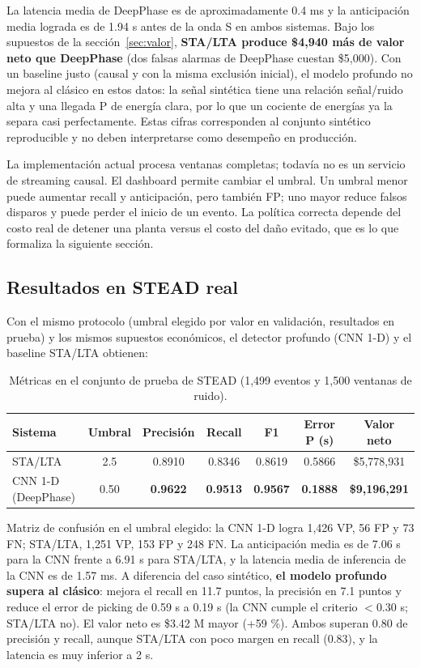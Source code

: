 \documentclass[11pt,letterpaper]{article}
\begin{document}
La latencia media de DeepPhase es de aproximadamente 0.4 ms y la anticipación
media lograda es de 1.94 s antes de la onda S en ambos sistemas. Bajo los
supuestos de la sección~\ref{sec:valor}, \textbf{STA/LTA produce \$4,940 más de
valor neto que DeepPhase} (dos falsas alarmas de DeepPhase cuestan \$5,000). Con
un baseline justo (causal y con la misma exclusión inicial), el modelo profundo
no mejora al clásico en estos datos: la señal sintética tiene una relación
señal/ruido alta y una llegada P de energía clara, por lo que un cociente de
energías ya la separa casi perfectamente. Estas cifras corresponden al conjunto
sintético reproducible y no deben interpretarse como desempeño en producción.

La implementación actual procesa ventanas completas; todavía no es un servicio
de streaming causal. El dashboard permite cambiar el umbral. Un umbral menor puede aumentar recall y
anticipación, pero también FP; uno mayor reduce falsos disparos y puede perder el
inicio de un evento. La política correcta depende del costo real de detener una
planta versus el costo del daño evitado, que es lo que formaliza la siguiente
sección.

\subsection{Resultados en STEAD real}\label{sec:stead-res}
Con el mismo protocolo (umbral elegido por valor en validación, resultados en
prueba) y los mismos supuestos económicos, el detector profundo (CNN 1-D) y el
baseline STA/LTA obtienen:

\begin{table}[h]
\centering
\caption{Métricas en el conjunto de prueba de STEAD (1,499 eventos y 1,500 ventanas de ruido).}
\begin{tabular}{lcccccc}
\toprule
Sistema & Umbral & Precisión & Recall & F1 & Error P (s) & Valor neto\\
\midrule
STA/LTA & 2.5 & 0.8910 & 0.8346 & 0.8619 & 0.5866 & \$5,778,931\\
CNN 1-D (DeepPhase) & 0.50 & \textbf{0.9622} & \textbf{0.9513} & \textbf{0.9567} & \textbf{0.1888} & \textbf{\$9,196,291}\\
\bottomrule
\end{tabular}
\end{table}

Matriz de confusión en el umbral elegido: la CNN 1-D logra 1,426 VP, 56 FP y 73 FN;
STA/LTA, 1,251 VP, 153 FP y 248 FN. La anticipación media es de 7.06 s para la CNN
frente a 6.91 s para STA/LTA, y la latencia media de inferencia de la CNN es de
1.57 ms. A diferencia del caso sintético, \textbf{el modelo profundo supera al
clásico}: mejora el recall en 11.7 puntos, la precisión en 7.1 puntos y reduce el
error de picking de 0.59 s a 0.19 s (la CNN cumple el criterio $<0.30$ s;
STA/LTA no). El valor neto es \$3.42 M mayor (+59 \%). Ambos superan 0.80 de
precisión y recall, aunque STA/LTA con poco margen en recall (0.83), y la latencia
es muy inferior a 2 s.
\end{document}
